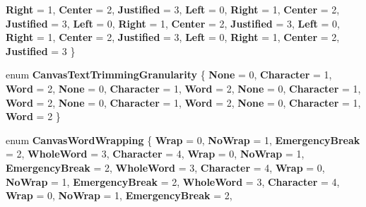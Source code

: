\begin{DoxyCompactItemize}
{\bfseries Right} = 1, 
{\bfseries Center} = 2, 
{\bfseries Justified} = 3, 
\newline
{\bfseries Left} = 0, 
{\bfseries Right} = 1, 
{\bfseries Center} = 2, 
{\bfseries Justified} = 3, 
\newline
{\bfseries Left} = 0, 
{\bfseries Right} = 1, 
{\bfseries Center} = 2, 
{\bfseries Justified} = 3, 
\newline
{\bfseries Left} = 0, 
{\bfseries Right} = 1, 
{\bfseries Center} = 2, 
{\bfseries Justified} = 3, 
\newline
{\bfseries Left} = 0, 
{\bfseries Right} = 1, 
{\bfseries Center} = 2, 
{\bfseries Justified} = 3
 \}
\item 
\mbox{\label{namespace_microsoft_1_1_graphics_1_1_canvas_1_1_text_a24d5fc875e6366ffdebd4fc9db910c21}} 
enum {\bfseries Canvas\+Text\+Trimming\+Granularity} \{ \newline
{\bfseries None} = 0, 
{\bfseries Character} = 1, 
{\bfseries Word} = 2, 
{\bfseries None} = 0, 
\newline
{\bfseries Character} = 1, 
{\bfseries Word} = 2, 
{\bfseries None} = 0, 
{\bfseries Character} = 1, 
\newline
{\bfseries Word} = 2, 
{\bfseries None} = 0, 
{\bfseries Character} = 1, 
{\bfseries Word} = 2, 
\newline
{\bfseries None} = 0, 
{\bfseries Character} = 1, 
{\bfseries Word} = 2
 \}
\item 
\mbox{\label{namespace_microsoft_1_1_graphics_1_1_canvas_1_1_text_aad13d6b470583df1dcc8167f6568eb39}} 
enum {\bfseries Canvas\+Word\+Wrapping} \{ \newline
{\bfseries Wrap} = 0, 
{\bfseries No\+Wrap} = 1, 
{\bfseries Emergency\+Break} = 2, 
{\bfseries Whole\+Word} = 3, 
\newline
{\bfseries Character} = 4, 
{\bfseries Wrap} = 0, 
{\bfseries No\+Wrap} = 1, 
{\bfseries Emergency\+Break} = 2, 
\newline
{\bfseries Whole\+Word} = 3, 
{\bfseries Character} = 4, 
{\bfseries Wrap} = 0, 
{\bfseries No\+Wrap} = 1, 
\newline
{\bfseries Emergency\+Break} = 2, 
{\bfseries Whole\+Word} = 3, 
{\bfseries Character} = 4, 
{\bfseries Wrap} = 0, 
\newline
{\bfseries No\+Wrap} = 1, 
{\bfseries Emergency\+Break} = 2, 

\end{DoxyCompactItemize}

